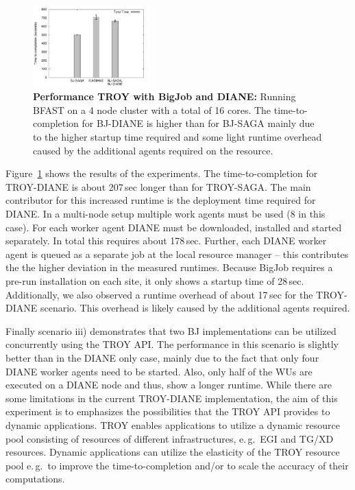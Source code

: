 \documentclass[conference,final]{IEEEtran}
\newcommand{\up}{\vspace*{-1em}}
\begin{document}
\begin{figure}[t]
	\centering
		\includegraphics[width=0.4\textwidth]{perf/perf-bfast-bj.pdf}
	\caption{\textbf{Performance TROY with BigJob and DIANE:} Running BFAST 
	on a 4 node cluster with a total of 16 cores. The time-to-completion for 
	BJ-DIANE is higher than for BJ-SAGA mainly due to the higher startup 
	time required and some light runtime overhead caused by the additional 
	agents required on the resource.\up\up}
	\label{fig:perf_perf-bfast-bj}
\end{figure}



Figure~\ref{fig:perf_perf-bfast-bj} shows the results of the
experiments. The time-to-completion for TROY-DIANE is about 207\,sec
longer than for TROY-SAGA. The main contributor for this increased
runtime is the deployment time required for DIANE. In a multi-node
setup multiple work agents must be used (8 in this case).  For each
worker agent DIANE must be downloaded, installed and started
separately. In total this requires about 178\,sec. Further, each DIANE
worker agent is queued as a separate job at the local resource manager
-- this contributes the the higher deviation in the measured
runtimes. Because BigJob requires a pre-run installation on each site,
it only shows a startup time of 28\,sec. Additionally, we also
observed a runtime overhead of about 17\,sec for the TROY-DIANE
scenario. This overhead is likely caused by the additional agents
required.


Finally scenario iii) demonstrates that two BJ implementations
can be utilized concurrently using the TROY
API. The performance in this scenario is slightly better than in the
DIANE only case, mainly due to the fact that only four DIANE worker
agents need to be started. Also, only half of the WUs are executed on
a DIANE node and thus, show a longer runtime. While there are some
limitations in the current TROY-DIANE implementation, the aim of this
experiment is to emphasizes the possibilities that the TROY API
provides to dynamic applications. TROY enables applications to utilize
a dynamic resource pool consisting of resources of different
infrastructures, e.\,g.\ EGI and TG/XD resources. Dynamic applications
can utilize the elasticity of the TROY resource pool e.\,g.\ to
improve the time-to-completion and/or to scale the accuracy of their
computations.
\end{document}
